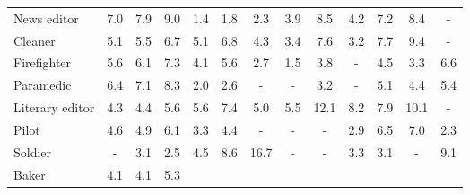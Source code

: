\begin{table*}[p]
{\begin{tabular}{l|ccc|ccc|ccc|ccc}
News editor
& \cellcolor{orange3} 7.0 & \cellcolor{orange3} 7.9 & \cellcolor{orange3} 9.0
& \cellcolor{orange1} 1.4 & \cellcolor{orange1} 1.8 & \cellcolor{blue1} 2.3
& \cellcolor{orange2} 3.9 & \cellcolor{orange3} 8.5 & \cellcolor{orange2} 4.2
& \cellcolor{orange3} 7.2 & \cellcolor{orange3} 8.4 & \cellcolor{lightgray} -
\\
Cleaner
& \cellcolor{orange2} 5.1 & \cellcolor{orange2} 5.5 & \cellcolor{orange3} 6.7
& \cellcolor{orange2} 5.1 & \cellcolor{orange3} 6.8 & \cellcolor{orange2} 4.3
& \cellcolor{orange1} 3.4 & \cellcolor{orange3} 7.6 & \cellcolor{orange1} 3.2
& \cellcolor{orange3} 7.7 & \cellcolor{orange4} 9.4 & \cellcolor{lightgray} -
\\
Firefighter
& \cellcolor{orange2} 5.6 & \cellcolor{orange2} 6.1 & \cellcolor{orange3} 7.3
& \cellcolor{orange2} 4.1 & \cellcolor{orange2} 5.6 & \cellcolor{orange1} 2.7
& \cellcolor{orange1} 1.5 & \cellcolor{orange1} 3.8 & \cellcolor{lightgray} -
& \cellcolor{orange2} 4.5 & \cellcolor{orange1} 3.3 & \cellcolor{blue3} 6.6
\\
Paramedic
& \cellcolor{orange2} 6.4 & \cellcolor{orange3} 7.1 & \cellcolor{orange3} 8.3
& \cellcolor{orange1} 2.0 & \cellcolor{orange1} 2.6 & \cellcolor{lightgray} -
& \cellcolor{lightgray} - & \cellcolor{orange1} 3.2 & \cellcolor{lightgray} -
& \cellcolor{orange2} 5.1 & \cellcolor{orange2} 4.4 & \cellcolor{blue2} 5.4
\\
Literary editor
& \cellcolor{orange2} 4.3 & \cellcolor{orange2} 4.4 & \cellcolor{orange2} 5.6
& \cellcolor{orange2} 5.6 & \cellcolor{orange3} 7.4 & \cellcolor{orange2} 5.0
& \cellcolor{orange2} 5.5 & \cellcolor{orange5} 12.1 & \cellcolor{orange3} 8.2
& \cellcolor{orange3} 7.9 & \cellcolor{orange4} 10.1 & \cellcolor{lightgray} -
\\
Pilot
& \cellcolor{orange2} 4.6 & \cellcolor{orange2} 4.9 & \cellcolor{orange2} 6.1
& \cellcolor{orange1} 3.3 & \cellcolor{orange2} 4.4 & \cellcolor{lightgray} -
& \cellcolor{lightgray} - & \cellcolor{lightgray} - & \cellcolor{blue1} 2.9
& \cellcolor{orange2} 6.5 & \cellcolor{orange3} 7.0 & \cellcolor{blue1} 2.3
\\
Soldier
& \cellcolor{lightgray} - & \cellcolor{blue1} 3.1 & \cellcolor{blue1} 2.5
& \cellcolor{blue2} 4.5 & \cellcolor{blue3} 8.6 & \cellcolor{blue6} 16.7
& \cellcolor{lightgray} - & \cellcolor{lightgray} - & \cellcolor{blue1} 3.3
& \cellcolor{orange1} 3.1 & \cellcolor{lightgray} - & \cellcolor{blue3} 9.1
\\
Baker
& \cellcolor{orange2} 4.1 & \cellcolor{orange2} 4.1 & \cellcolor{orange2} 5.3

\end{tabular}}
\end{table*}
